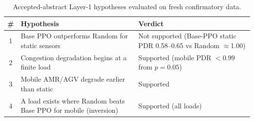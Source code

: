 \begin{table}[t]\centering\small
\caption{Accepted-abstract Layer-1 hypotheses evaluated on fresh confirmatory data.}\label{tab:hyp}
\begin{tabular}{@{}cp{}p{}@{}}\toprule
\# & Hypothesis & Verdict \\ \midrule
1 & Base PPO outperforms Random for static sensors & Not supported (Base-PPO static PDR 0.58--0.65 vs Random $\approx$1.00) \\
2 & Congestion degradation begins at a finite load & Supported (mobile PDR $<0.99$ from $p=0.05$) \\
3 & Mobile AMR/AGV degrade earlier than static & Supported \\
4 & A load exists where Random beats Base PPO for mobile (inversion) & Supported (all loads) \\
\bottomrule\end{tabular}\end{table}